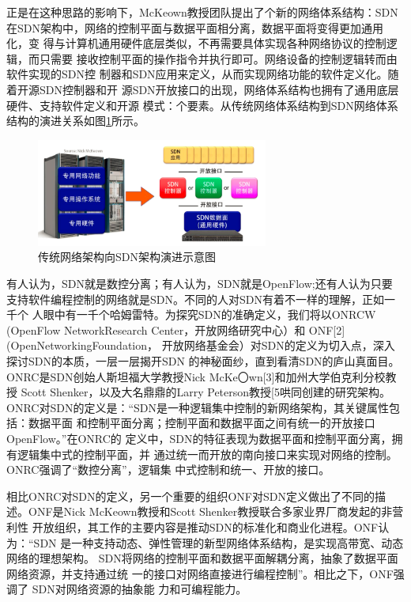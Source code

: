 正是在这种思路的影响下，McKeown教授团队提出了个新的网络体系结构：SDN在SDN架构中，网络的控制平面与数据平面相分离，数据平面将变得更加通用化，变 得与计算机通用硬件底层类似，不再需要具体实现各种网络协议的控制逻辑，而只需要 接收控制平面的操作指令并执行即可。网络设备的控制逻辑转而由软件实现的SDN控 制器和SDN应用来定义，从而实现网络功能的软件定义化。随着开源SDN控制器和开 源SDN开放接口的出现，网络体系结构也拥有了通用底层硬件、支持软件定义和开源 模式：个要素。从传统网络体系结构到SDN网络体系结构的演进关系如图\ref{fig:SchematicDiagram4EvolutionFromTraditionalNetworkArchitecture2SDNArchitecture}所示。
\begin{figure}[htbp]
\centering
\includegraphics[width=3.0in]{figures/SchematicDiagram4EvolutionFromTraditionalNetworkArchitecture2SDNArchitecture}
  \caption{传统网络架构向SDN架构演进示意图}
  \label{fig:SchematicDiagram4EvolutionFromTraditionalNetworkArchitecture2SDNArchitecture}
\end{figure}



有人认为，SDN就是数控分离；有人认为，SDN就是OpenFlow;还有人认为只要 支持软件编程控制的网络就是SDN。不同的人对SDN有着不一样的理解，正如一千个 人眼中有一千个哈姆雷特。为探究SDN的准确定义，我们将以ONRCW (OpenFlow NetworkResearch Center，开放网络研究中心）和 ONF[2] (OpenNetworkingFoundation， 开放网络基金会）对SDN的定义为切入点，深入探讨SDN的本质，一层一层揭开SDN 的神秘面纱，直到看清SDN的庐山真面目。ONRC是SDN创始人斯坦福大学教授Nick McKe〇wn[3]和加州大学伯克利分校教授 Scott Shenker，以及大名鼎鼎的Larry Peterson教授[5哄同创建的研究架构。ONRC对SDN的定义是：“SDN是一种逻辑集中控制的新网络架构，其关键属性包括：数据平面 和控制平面分离；控制平面和数据平面之间有统一的开放接口 OpenFlow。”在ONRC的 定义中，SDN的特征表现为数据平面和控制平面分离，拥有逻辑集中式的控制平面，并 通过统一而开放的南向接口来实现对网络的控制。ONRC强调了“数控分离”，逻辑集 中式控制和统一、开放的接口。

相比ONRC对SDN的定义，另一个重要的组织ONF对SDN定义做出了不同的描 述。ONF是Nick McKeown教授和Scott Shenker教授联合多家业界厂商发起的非营利性 开放组织，其工作的主要内容是推动SDN的标准化和商业化进程。ONF认为：“SDN 是一种支持动态、弹性管理的新型网络体系结构，是实现高带宽、动态网络的理想架构。 SDN将网络的控制平面和数据平面解耦分离，抽象了数据平面网络资源，并支持通过统 一的接口对网络直接进行编程控制”。相比之下，ONF强调了 SDN对网络资源的抽象能 力和可编程能力。

